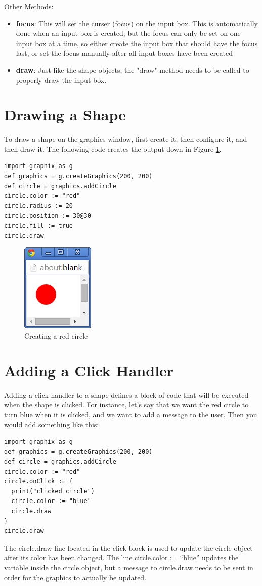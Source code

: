 \documentclass{article}
\begin{document}
Other Methods:
\begin{itemize}
\item \textbf{focus}: This will set the curser (focus) on the input box. This is automatically done
when an input box is created, but the focus can only be set on one input box at a time, so
either create the input box that should have the focus last, or set the focus manually after all
input boxes have been created
\item \textbf{draw}: Just like the shape objects, the "draw" method needs to be called to properly
draw the input box.
\end{itemize}

\section{Drawing a Shape}
To draw a shape on the graphics window, first create it, then configure it, and then draw it. The following code
creates the output down in Figure \ref{fig:red_circle}.
\begin{lstlisting}
import graphix as g
def graphics = g.createGraphics(200, 200)
def circle = graphics.addCircle
circle.color := "red"
circle.radius := 20
circle.position := 30@30
circle.fill := true
circle.draw
\end{lstlisting}

\begin{figure}[h]
\includegraphics{red_circle}
\centering
\caption{Creating a red circle}
\label{fig:red_circle}
\end{figure}

\section{Adding a Click Handler}
Adding a click handler to a shape defines a block of code that will be executed when the shape is clicked. For instance,
let's say that we want the red circle to turn blue when it is clicked, and we want to add a message to the user. 
Then you would add something like this:
\begin{lstlisting}
import graphix as g
def graphics = g.createGraphics(200, 200)
def circle = graphics.addCircle
circle.color := "red"
circle.onClick := { 
  print("clicked circle") 
  circle.color := "blue"
  circle.draw
}
circle.draw
\end{lstlisting}
The \color{blue} circle.draw \color{black} line located in the click block is used to update the circle object after its color
has been changed. The line \color{blue}circle.color := ``blue'' \color{black} updates the variable inside the circle object, but
a message to circle.draw needs to be sent in order for the graphics to actually be updated.
\end{document}
